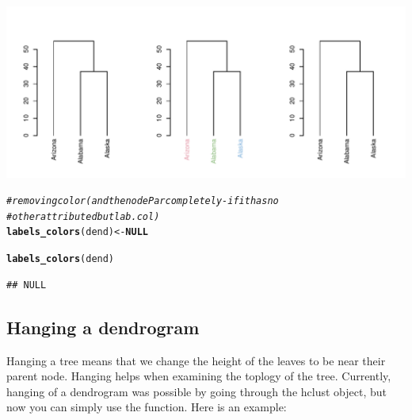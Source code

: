 \documentclass[shortnames,nojss,article]{jss}\usepackage[]{graphicx}\usepackage[]{color}
\makeatletter
\def\maxwidth{ %
  \ifdim\Gin@nat@width>\linewidth
    \linewidth
  \else
    \Gin@nat@width
  \fi
}
\newcommand{\hlcom}[1]{\textcolor[rgb]{0.678,0.584,0.686}{\textit{#1}}}%
\newcommand{\hlstd}[1]{\textcolor[rgb]{0.345,0.345,0.345}{#1}}%
\newcommand{\hlkwa}[1]{\textcolor[rgb]{0.161,0.373,0.58}{\textbf{#1}}}%
\newcommand{\hlkwb}[1]{\textcolor[rgb]{0.69,0.353,0.396}{#1}}%
\newcommand{\hlkwd}[1]{\textcolor[rgb]{0.737,0.353,0.396}{\textbf{#1}}}%
\newenvironment{kframe}{%
 \def\at@end@of@kframe{}%
 \ifinner\ifhmode%
  \def\at@end@of@kframe{\end{minipage}}%
  \begin{minipage}{\columnwidth}%
 \fi\fi%
 \def\FrameCommand##1{\hskip\@totalleftmargin \hskip-\fboxsep
 \colorbox{shadecolor}{##1}\hskip-\fboxsep
     \hskip-\linewidth \hskip-\@totalleftmargin \hskip\columnwidth}%
 \MakeFramed {\advance\hsize-\width
   \@totalleftmargin\z@ \linewidth\hsize
   \@setminipage}}%
 {\par\unskip\endMakeFramed%
 \at@end@of@kframe}
\newenvironment{knitrout}{}{} %
\makeatother
\begin{document}
\begin{knitrout}
{\centering \includegraphics[width=\maxwidth]{figure/unnamed-chunk-26} 

}


\begin{kframe}\begin{alltt}
\hlcom{# removing color (and the nodePar completely - if it has no}
\hlcom{# other attributed but lab.col)}
\hlkwd{labels_colors}\hlstd{(dend)} \hlkwb{<-} \hlkwa{NULL}
\end{alltt}


{\ttfamily\noindent\color{warningcolor}{\#\# Warning: Length of color vector was shorter than the number of leaves - vector color recycled\\\#\# Warning: 'x' is NULL so the result will be NULL}}\begin{alltt}
\hlkwd{labels_colors}\hlstd{(dend)}
\end{alltt}
\begin{verbatim}
## NULL
\end{verbatim}
\end{kframe}
\end{knitrout}





\subsection{Hanging a dendrogram}

Hanging a tree means that we change the height of the leaves to be near their parent node. Hanging helps when examining the toplogy of the tree. Currently, hanging of a dendrogram was possible by going through the hclust object, but now you can simply use the  function. Here is an example:
\end{document}

